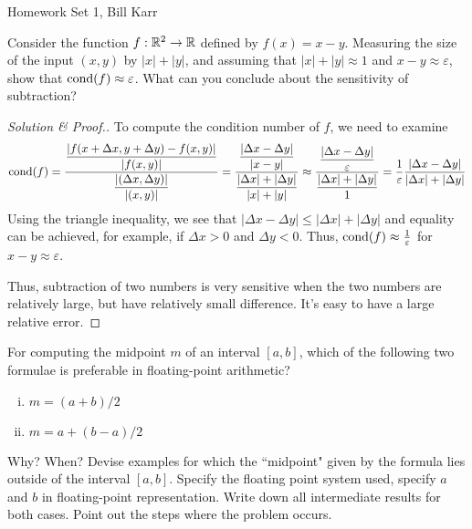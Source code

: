 \documentclass[10pt]{article}
\newcommand{\eps}{\varepsilon}
\begin{document}
%
{Homework Set 1, Bill Karr}


Consider the function $f : \mathbb{R}^2 \to \mathbb{R} $ defined by $ f(x) = x - y $. Measuring the size of the input $ (x,y) $ by $ |x| + |y| $, and assuming that $ |x| + |y| \approx 1 $ and $ x - y \approx \eps $, show that $ \cond(f) \approx \eps $. What can you conclude about the sensitivity of subtraction?

\begin{proof}[Solution \& Proof.]
To compute the condition number of $f$, we need to examine $$
\cond(f) = \frac{ \dfrac{| f(x + \Delta x, y + \Delta y) - f(x,y) |}{|f(x,y)|} }{ \dfrac{ | ( \Delta x, \Delta y) | }{ |(x,y)| } } = 
\frac{ \dfrac{| \Delta x - \Delta y |}{|x - y|} }{ \dfrac{ | \Delta x | + | \Delta y | }{ |x| + |y| } } \approx \frac{ \dfrac{| \Delta x - \Delta y |}{\eps} }{ \dfrac{ | \Delta x | + | \Delta y | }{ 1 } } = \frac{1}{\eps} \frac{|\Delta x - \Delta y | }{|\Delta x | + | \Delta y |}
$$ Using the triangle inequality, we see that $ | \Delta x - \Delta y | \leq |\Delta x | + | \Delta y | $ and equality can be achieved, for example, if $ \Delta x > 0 $ and $ \Delta y < 0 $. Thus, $ \cond(f) \approx \frac{1}{\eps} $ for $ x - y \approx \eps $.

Thus, subtraction of two numbers is very sensitive when the two numbers are relatively large, but have relatively small difference. It's easy to have a large relative error.
\end{proof}


For computing the midpoint $m$ of an interval $ [a,b] $, which of the following two formulae is preferable in floating-point arithmetic?

\begin{enumerate}[(i)]
  \item $m = (a + b)/2$

  \item $ m = a + (b - a)/2 $
\end{enumerate}

Why? When? Devise examples for which the ``midpoint" given by the formula lies outside of the interval $ [a,b] $. Specify the floating point system used, specify $a$ and $b$ in floating-point representation. Write down all intermediate results for both cases. Point out the steps where the problem occurs.
\end{document}
